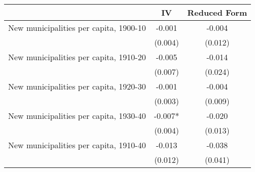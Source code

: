  \begin{tabular}{l*{2}{c}} \toprule
                &\multicolumn{1}{c}{IV}&\multicolumn{1}{c}{Reduced Form}\\
\midrule
New municipalities per capita, 1900-10&   -0.001   &   -0.004   \\
                &  (0.004)   &  (0.012)   \\
\addlinespace
New municipalities per capita, 1910-20&   -0.005   &   -0.014   \\
                &  (0.007)   &  (0.024)   \\
\addlinespace
New municipalities per capita, 1920-30&   -0.001   &   -0.004   \\
                &  (0.003)   &  (0.009)   \\
\addlinespace
New municipalities per capita, 1930-40&   -0.007*  &   -0.020   \\
                &  (0.004)   &  (0.013)   \\
\addlinespace
New municipalities per capita, 1910-40&   -0.013   &   -0.038   \\
                &  (0.012)   &  (0.041)   \\
       \bottomrule \end{tabular}
